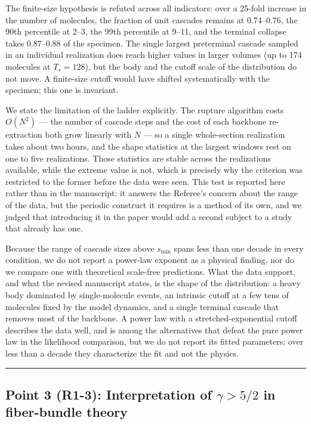 \documentclass[11pt]{article}
\newcommand{\pointseparator}{%
  \par\bigskip
  {\color{rulegray}\hrule}
  \par\bigskip
}
\begin{document}
The finite-size hypothesis is refuted across all indicators: over a 25-fold
increase in the number of molecules, the fraction of unit cascades remains at
0.74--0.76, the 90th percentile at 2--3, the 99th percentile at 9--11, and the
terminal collapse takes 0.87--0.88 of the specimen. The single largest
preterminal cascade sampled in an individual realization does reach higher
values in larger volumes (up to 174 molecules at $T_s=128$), but the body and
the cutoff scale of the distribution do not move. A finite-size cutoff would
have shifted systematically with the specimen; this one is invariant.

We state the limitation of the ladder explicitly. The rupture algorithm costs
$O(N^2)$ --- the number of cascade steps and the cost of each backbone
re-extraction both grow linearly with $N$ --- so a single whole-section
realization takes about two hours, and the shape statistics at the largest
windows rest on one to five realizations. Those statistics are stable across the
realizations available, while the extreme value is not, which is precisely why
the criterion was restricted to the former before the data were seen. This test
is reported here rather than in the manuscript: it answers the Referee's concern
about the range of the data, but the periodic construct it requires is a method
of its own, and we judged that introducing it in the paper would add a second
subject to a study that already has one.

Because the range of cascade sizes above $s_{\min}$ spans less than one decade
in every condition, we do not report a power-law exponent as a physical finding,
nor do we compare one with theoretical scale-free predictions. What the data
support, and what the revised manuscript states, is the shape of the
distribution: a heavy body dominated by single-molecule events, an intrinsic
cutoff at a few tens of molecules fixed by the model dynamics, and a single
terminal cascade that removes most of the backbone. A power law with a
stretched-exponential cutoff describes the data well, and is among the
alternatives that defeat the pure power law in the likelihood comparison, but we
do not report its fitted parameters: over less than a decade they characterize
the fit and not the physics.


\pointseparator


\subsection*{Point 3 (R1-3): Interpretation of \(\gamma>5/2\) in fiber-bundle theory}
\end{document}
